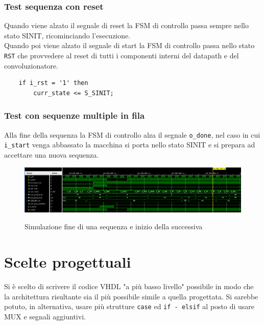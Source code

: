 \documentclass[12pt, a4paper]{article}
\begin{document}

\pagebreak

\vspace{10cm}

\subsubsection{Test sequenza con reset}

Quando viene alzato il segnale di reset la FSM di controllo passa sempre nello stato SINIT, ricominciando l'esecuzione.\\
\noindent Quando poi viene alzato il segnale di start la FSM di controllo passa nello stato \texttt{RST}
che provvedere al reset di tutti i componenti interni del datapath e del convoluzionatore.

\begin{verbatim}
    if i_rst = '1' then
        curr_state <= S_SINIT;
\end{verbatim}

\subsubsection{Test con sequenze multiple in fila}

Alla fine della sequenza la FSM di controllo alza il segnale \texttt{o\_done}, nel caso in cui \texttt{i\_start} venga abbassato
la macchina si porta nello stato SINIT e si prepara ad accettare una nuova sequenza.

\begin{figure}[h!]
    \centering
    \includegraphics[scale=0.3]{sim_mult_seq.png}
    \label{img:sim_multseq_change}
    \caption{Simulazione fine di una sequenza e inizio della successiva}
\end{figure}

\section{Scelte progettuali}

Si è scelto di scrivere il codice VHDL "a più basso livello" possibile in modo
che la architettura risultante sia il più possibile simile a quella progettata.
Si sarebbe potuto, in alternativa, usare più strutture \texttt{case} ed \texttt{if - elsif} 
al posto di usare MUX e segnali aggiuntivi.
\end{document}
